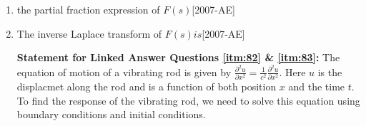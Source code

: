 \documentclass[journal]{IEEEtran}
\begin{document}
\begin{enumerate}
    \item the partial fraction expression of $F(s)$\label{itm:80}\hfill{[2007-AE]}
        \begin{enumerate}
        \end{enumerate}
    \item The inverse Laplace transform of $F(s) is$\label{itm:81}\hfill{[2007-AE]}
        \begin{enumerate}
        \end{enumerate}

\textbf{Statement for Linked Answer Questions \ref{itm:82} \& \ref{itm:83}: }The equation of motion of a vibrating rod is given by $\frac{\partial^2u}{\partial x^2} = \frac{1}{c^2}\frac{\partial^2u}{\partial x^2}$. Here $u$ is the displacmet along the rod and is a function of both position $x$ and the time $t$. To find the response of the vibrating rod, we need to solve this equation using boundary conditions and initial conditions.


\end{enumerate}
\end{document}
